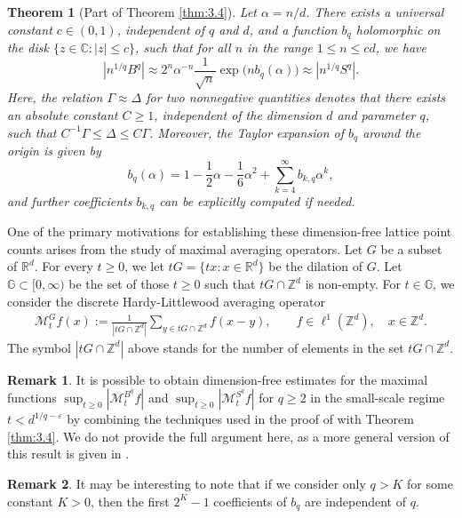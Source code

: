 \documentclass[a4paper,twoside, reqno]{amsart}
\numberwithin{equation}{section}
\newtheorem{Thm}{Theorem}[section]
\theoremstyle{definition}%
\newtheorem{Rem}{Remark}
\theoremstyle{definition}
\theoremstyle{definition}%
\theoremstyle{definition}
\newcommand{\Z}{\mathbb{Z}}
\newcommand{\R}{\mathbb{R}}
\begin{document}
\begin{Thm}[Part of Theorem \ref{thm:3.4}] \label{thm:3.4_partial}
Let $\alpha = n/d$. There exists a universal constant $c\in(0,1)$, independent of $q$ and $d$, and a function $b_q$ holomorphic on the disk $\{z\in\mathbb{C}: |z| \leq c\}$, such that for all $n$ in the range $1\leq n\leq cd$, we have
\begin{equation} \label{improvement}
|n^{1/q}B^q| \approx 2^n \alpha^{-n}  \frac{1}{\sqrt{n}}\exp \big(n b_q(\alpha) \big) \approx |n^{1/q}S^q|.
\end{equation}
Here, the relation $\Gamma\approx\Delta$ for two nonnegative quantities denotes that there exists an absolute constant $C \geq 1$, independent of the dimension $d$ and parameter $q$, such that $C^{-1}\Gamma \leq \Delta \leq C\Gamma$. 
Moreover, the Taylor expansion of $b_q$ around the origin is given by 
\[
   b_q(\alpha)= 1 - \frac{1}{2}\alpha - \frac{1}{6} \alpha^2 + \sum_{k=4}^\infty b_{k,q}\alpha^k,
\]
and further coefficients $b_{k,q}$ can be explicitly computed if needed.
\end{Thm}

One of the primary motivations for establishing these dimension-free lattice point counts arises from the study of maximal averaging operators. Let $G$ be a subset of $\R^d$. For every $t\ge 0$, we let $tG=\{tx\colon x\in\R^d\}$ be the dilation of $G.$ Let $\mathbb{G}\subset [0,\infty)$ be the set of those $t\ge 0$ such that $tG\cap \Z^d$ is non-empty. For $t\in \mathbb{G}$, we consider the discrete Hardy-Littlewood averaging operator
\begin{align*}
	\mathcal M_t^Gf(x):=\frac{1}{|tG\cap \Z^d|}\sum_{y\in tG\cap\Z^d}f(x-y),
	 \qquad f\in \ell^1(\Z^d),\quad 
	x\in\Z^d.
\end{align*}
The symbol $|tG\cap \Z^d|$ above stands for the number of elements in the set $tG\cap \Z^d.$

\begin{Rem}
It is possible to obtain dimension-free estimates for the maximal functions $\sup_{t\geq 0}|\mathcal{M}^{B^q}_tf|$ and $\sup_{t\geq 0} |\mathcal{M}^{S^q}_t f|$ for $q\geq 2$ in the small-scale regime $t < d^{1/q - \varepsilon}$ by combining the techniques used in the proof of \cite[Theorem 1.2]{l2_balls} with Theorem \ref{thm:3.4}. We do not provide the full argument here, as a more general version of this result is given in \cite{niks_maksymalne}.
\end{Rem}

\begin{Rem}
It may be interesting to note that if we consider only $q > K$ for some constant $K>0$, then the first $2^K-1$ coefficients of $b_q$ are independent of $q$.
\end{Rem}
\end{document}
